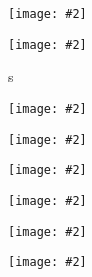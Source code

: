 \documentclass[landscape,a0b,final]{a0poster}
\newenvironment{poster}{
  \begin{center}
  \begin{minipage}[c]{0.98\textwidth}
}{
  \end{minipage} 
  \end{center}
}
\newcommand{\myfig}[3][0]{
\begin{center}
  \vspace{1.5cm}
  \texttt{[image: \#2]}
  \nobreak\medskip
\end{center}}
\newcommand{\mycaption}[1]{
  \vspace{0.5cm}
  \begin{quote}
    {{\sc Fig.} \arabic{figure}: #1}
  \end{quote}
  \vspace{1cm}
  \stepcounter{figure}
}
\begin{document}
\begin{poster}
\begin{multicols}{3}
  \vspace{-1cm}
  \setlength{\columnsep}{0pt}
  \setlength{\columnseprule}{0pt}
  \hspace{-2cm}
  \begin{multicols}{2}
  \begin{center}
  \myfig{c_fourier_350_2_36_2.ps}{1.0}
  \end{center}

  \begin{center}
  \myfig{c_pulse_350_2_36_2.ps}{1.0}
  \end{center}
  \end{multicols}

  \vspace{-4.0cm}
  \setlength{\columnsep}{0pt}
  \setlength{\columnseprule}{0pt}
  \hspace{-2cm}s
  \begin{multicols}{2}
  \begin{center}
  \myfig{c_fourier_350_10_20_10.ps}{1.0}
  \end{center}

  \begin{center}
  \myfig{c_pulse_350_10_20_10.ps}{1.0}
  \end{center}
  \end{multicols}

  \vspace{-4.0cm}
  \setlength{\columnsep}{0pt}
  \setlength{\columnseprule}{0pt}
  \hspace{-2cm}
  \begin{multicols}{2}
  \begin{center}
  \myfig{c_fourier_350_20_0_20.ps}{1.0}
  \end{center}

  \begin{center}
  \myfig{c_pulse_350_20_0_20.ps}{1.0}
  \end{center}
  \end{multicols}

  \vspace{-4.0cm}
  \setlength{\columnsep}{0pt}
  \setlength{\columnseprule}{0pt}
  \hspace{-2cm}
  \begin{multicols}{2}
  
  \begin{center}
  \myfig{c_overlap_350_025.ps}{1.0}
  \end{center}

  \begin{center}
  \myfig{c_overlap_350_1.ps}{1.0}
  \end{center}


\end{multicols}
\end{multicols}
\end{poster}
\end{document}
